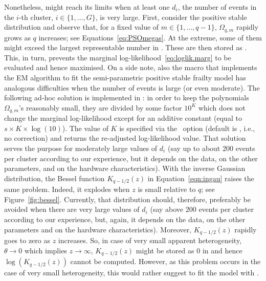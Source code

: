 Nonetheless,  might reach its limits when at least one $d_i$,
  the number of events in the $i$-th cluster, $i \in \{ 1, \ldots{}, G \}$, is very large.
% 
First, consider the positive stable distribution and observe that, 
  for a fixed value of $m \in \{1, \ldots, q-1\}$, $\Omega_{q, m}$ rapidly grows as $q$ increases; 
  see Equations~\ref{eq:PSOmegas}.
At the extreme, some of them might exceed the largest representable number in .
These are then stored as . 
This, in turn, prevents the marginal log-likelihood~\ref{eq:loglik.marg} to be evaluated and hence maximised.
On a side note, also the  macro  that implements the EM algorithm to fit the semi-parametric positive stable frailty model 
	has analogous difficulties when the number of events is large (or even moderate).
The following ad-hoc solution is implemented in :
  in order to keep the polynomials $\Omega_{q, m}$'s reasonably small, 
  they are divided by some factor $10^{K}$ which does not change the marginal log-likelihood
	except for an additive constant (equal to $s \times K \times \log ( 10 )$).
The value of $K$ is specified via the ~option (default is , i.e., no correction)
	and  returns the re-adjusted log-likelihood value.
That solution serves the purpose for moderately large values of $d_{i}$ 
  (say up to about $200$ events per cluster according to our experience, 
  but it depends on the data, on the other parameters,
  and on the hardware characteristics).
%   
With the inverse Gaussian distribution, 
  the Bessel function $K_{q - 1 \slash 2} ( z )$ in Equation~\ref{eqn:ingau} raises the same problem.
Indeed, it explodes when $z$ is small relative to $q$; see Figure~\ref{fig:bessel}.
Currently, that distribution should, therefore, preferably be avoided when there are very 
  large values of $d_{i}$ (say above $200$ events per cluster according to our experience,
  but, again, it depends on the data, on the other parameters and on the hardware characteristics).
Moreover, $K_{q - 1 \slash 2} ( z )$ rapidly goes to zero as $z$ increases. 
So, in case of very small apparent heterogeneity, $\theta \rightarrow 0$ which implies $z \rightarrow \infty$, 
	$K_{q - 1 \slash 2} ( z )$ might be stored as $0$ in  and hence $\log( K_{q - 1 \slash 2} ( z ) )$ 
	cannot be computed.
However, 
  as this problem occurs in the case of very small heterogeneity,
  this would rather suggest to fit the model with .	
